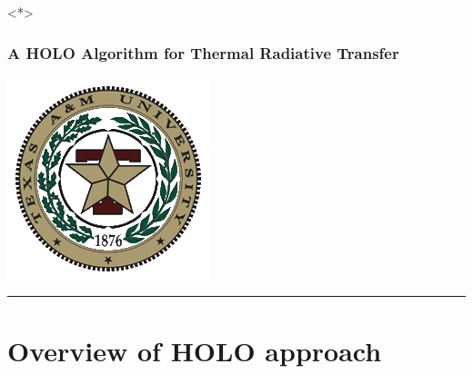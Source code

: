 \documentclass[xcolor=dvipsnames,hyperref={pdfpagelabels=false},unknownkeysallowed]{beamer}
\newcommand{\shorttitle}{\color{black} A HOLO Algorithm for Thermal Radiative Transfer
    \makebox[\linewidth]{\rule{\textwidth}{5pt}}
}
\begin{document}
\begin{frame}<*>
    \frametitle{\shorttitle}
        \vspace{0pt}
        \begin{minipage}[c][0.6\textheight]{0.2\textwidth}
            \hspace{-2em}\includegraphics[width=\textwidth]{tamu_seal.png}\hspace{1em}
            \rule[-0.3\textheight]{1pt}{0.8\textheight}
        \end{minipage}
    \vspace{0pt}
        \begin{minipage}[c][0.6\textheight]{0.74\textwidth}
\tableofcontents[
hideothersubsections,
sectionstyle=show,
subsectionstyle=hide
]
         \end{minipage}
\end{frame}

\section{Overview of HOLO approach}
\subsection{}
\end{document}
